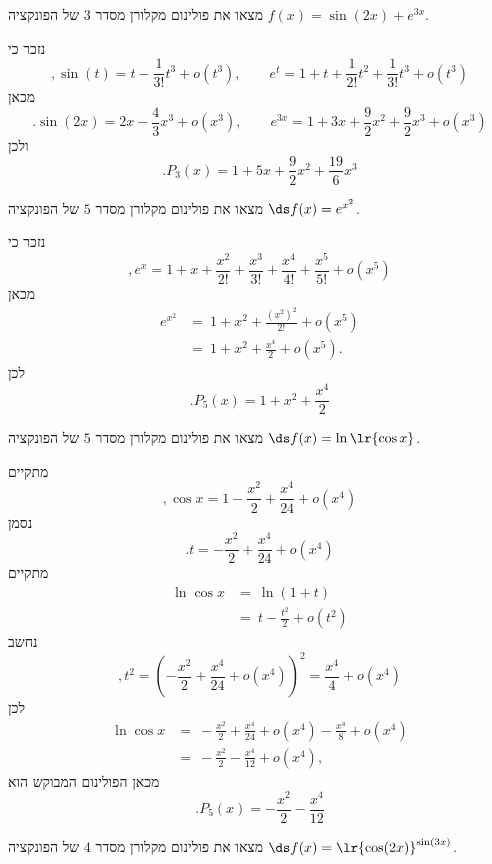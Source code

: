 \bE
\item
מצאו את פולינום מקלורן מסדר
\(3\)
של הפונקציה
$f(x)=\sin(2x)+e^{3x}$.
\begin{solbox}
נזכר כי
$$,\sin(t)=t-\frac{1}{3!}t^3+o(t^3),\qquad
e^{t}=1+t+\frac{1}{2!}t^2+\frac{1}{3!}t^3+o(t^3)$$
מכאן
\[
.\sin(2x)=2x-\frac{4}{3}x^3+o(x^3),\qquad
e^{3x}=1+3x+\frac{9}{2}x^2+\frac{9}{2}x^3+o(x^3)
\]
ולכן
\[
.P_3(x)=1+5x+\frac{9}{2}x^2+\frac{19}{6}x^3
\]
\end{solbox}
 \item מצאו את פולינום מקלורן מסדר $5$ של הפונקציה $\ds f(x)=e^{x^2}$.
\begin{solbox}
נזכר כי
$$,e^x=1+x+\frac{x^2}{2!}+\frac{x^3}{3!}+\frac{x^4}{4!}+\frac{x^5}{5!}+o(x^5)$$
מכאן
\begin{align*}
e^{x^2}&=\
1+x^2+\frac{(x^2)^2}{2!}+o(x^5)\\
&=\ 1+x^2+\frac{x^4}{2}+o(x^5).
\end{align*}
לכן
\[
.P_5(x)=1+x^2+\frac{x^4}{2}
\]
\end{solbox}
 \item מצאו את פולינום מקלורן מסדר $5$ של הפונקציה $\ds f(x)=\ln\lr{\cos x}$.
\begin{solbox}
מתקיים
\[
,\cos x=1-\frac{x^2}{2}+\frac{x^4}{24}+o(x^4)
\]
נסמן
$$.t=-\frac{x^2}{2}+\frac{x^4}{24}+o(x^4)$$
מתקיים
\begin{align*}
    \ln\cos x&=\ \ln(1+t)\\
    &=\ t-\frac{t^2}{2}+o(t^2)
\end{align*}
נחשב
$$,t^2=\left(-\frac{x^2}{2}+\frac{x^4}{24}+o(x^4)\right)^2=\frac{x^4}{4}+o(x^4)$$
לכן
\begin{align*}
    \ln\cos x&=\ -\frac{x^2}{2}+\frac{x^4}{24}+o(x^4)-\frac{x^4}{8}+o(x^4)\\
    &=\ -\frac{x^2}{2}-\frac{x^4}{12}+o(x^4),
\end{align*}
מכאן הפולינום המבוקש הוא
$$.P_5(x)=-\frac{x^2}{2}-\frac{x^4}{12}$$
\end{solbox}
 \item מצאו את פולינום מקלורן מסדר $4$ של הפונקציה $\ds f(x)=\lr{\cos(2x)}^{\sin (3x)}$.

